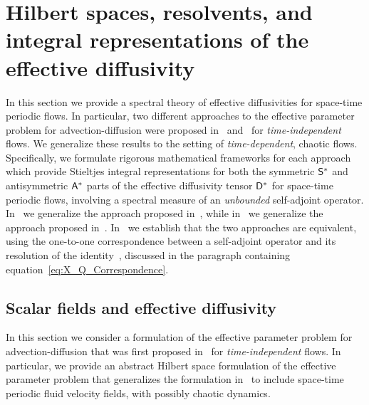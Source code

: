 \documentclass[amsa]{ipart}
\begin{document}
\section{Hilbert spaces, resolvents, and integral representations of the effective diffusivity}
\label{app:Hilbert_Resolvent_Integral_Reps} 
%
In this section we provide a spectral theory of effective
diffusivities for space-time periodic flows. In particular, two
different approaches to the effective parameter problem for
advection-diffusion were proposed
in~\cite{Pavliotis:PHD_Thesis,Bhattacharya:AAP:1999:951}  
and~\cite{Avellaneda:PRL-753,Avellaneda:CMP-339} for
\emph{time-independent} flows. We generalize these results to the
setting of \emph{time-dependent}, chaotic flows. Specifically, we
formulate rigorous mathematical 
frameworks for each approach which provide Stieltjes integral
representations for both the symmetric $\mathsf{S}^*$ and antisymmetric
$\mathsf{A}^*$ parts of the effective diffusivity tensor $\mathsf{D}^*$ for
space-time periodic flows, involving a spectral measure of an
\emph{unbounded} self-adjoint operator. In~
we generalize the approach proposed
in~\cite{Pavliotis:PHD_Thesis}, 
while in~ we generalize the approach
proposed
in~\cite{Avellaneda:PRL-753,Avellaneda:CMP-339}. In~
we establish that the two approaches are equivalent, using the
one-to-one correspondence between a self-adjoint operator and its
resolution of the identity~\cite{Stone:64}, discussed in the paragraph
containing equation~\eqref{eq:X_Q_Correspondence}.   



\subsection{Scalar fields and effective diffusivity}\label{app:Scalar_Fields}
%
In this section we consider a formulation of the effective parameter
problem for advection-diffusion that was first proposed
in~\cite{Pavliotis:PHD_Thesis,Bhattacharya:AAP:1999:951} for
\emph{time-independent} flows. In particular, we provide an abstract
Hilbert space formulation of the effective parameter problem that
generalizes the formulation in~\cite{Pavliotis:PHD_Thesis} to include
space-time periodic fluid velocity fields, with possibly chaotic
dynamics. 
\end{document}
